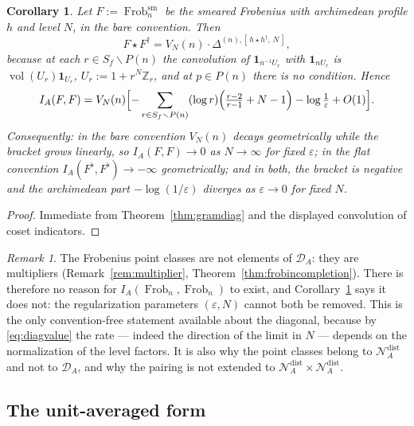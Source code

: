 \documentclass[11pt]{amsart}
\newtheorem{corollary}[theorem]{Corollary}
\theoremstyle{definition}
\theoremstyle{remark}
\newtheorem{remark}[theorem]{Remark}
\newcommand{\Z}{\mathbb Z}
\newcommand{\Frob}{\operatorname{Frob}}
\newcommand{\vol}{\operatorname{vol}}
\newcommand{\DA}{\mathcal D_A}
\begin{document}
\begin{corollary}\label{cor:gramdiagconv}
Let $F:=\Frob_n^{\mathrm{sm}}$ be the smeared Frobenius with archimedean
profile $h$ and level $N$, in the bare convention. Then
\begin{equation}\label{eq:FFdagger}
  F\star F^\dagger=V_N(n)\cdot\Delta^{(n),[\,h\star h^\dagger,\,N\,]},
\end{equation}
because at each $r\in S_f\smallsetminus P(n)$ the convolution of
$\mathbf 1_{n^{-1}U_r}$ with $\mathbf 1_{nU_r}$ is
$\vol(U_r)\mathbf 1_{U_r}$, $U_r:=1+r^N\Z_r$, and at $p\in P(n)$ there is no
condition. Hence
\begin{equation}\label{eq:diagvalue}
  I_A(F,F)=V_N(n)\Bigl[-\sum_{r\in S_f\smallsetminus P(n)}(\log r)
    \Bigl(\tfrac{r-2}{r-1}+N-1\Bigr)-\log\tfrac1\varepsilon+O(1)\Bigr].
\end{equation}
Consequently: in the bare convention $V_N(n)$ decays geometrically while the
bracket grows linearly, so $I_A(F,F)\to0$ as $N\to\infty$ for fixed
$\varepsilon$; in the flat convention $I_A(F^\flat,F^\flat)\to-\infty$
geometrically; and in both, the bracket is negative and the archimedean part
$-\log(1/\varepsilon)$ diverges as $\varepsilon\to0$ for fixed $N$.
\end{corollary}

\begin{proof}
Immediate from Theorem~\ref{thm:gramdiag} and the displayed convolution of
coset indicators.
\end{proof}

\begin{remark}\label{rem:nodiagonal}
The Frobenius point classes are not elements of $\DA$: they are multipliers
(Remark~\ref{rem:multiplier}, Theorem~\ref{thm:frobincompletion}). There is
therefore no reason for $I_A(\Frob_n,\Frob_n)$ to exist, and
Corollary~\ref{cor:gramdiagconv} says it does not: the regularization
parameters $(\varepsilon,N)$ cannot both be removed. This is the only
convention-free statement available about the diagonal, because by
\eqref{eq:diagvalue} the rate --- indeed the direction of the limit in $N$ ---
depends on the normalization of the level factors. It is also why the point
classes belong to $\mathcal N_A^{\mathrm{dist}}$ and not to $\DA$, and why the
pairing is not extended to $\mathcal N_A^{\mathrm{dist}}\times
\mathcal N_A^{\mathrm{dist}}$.
\end{remark}

\subsection{The unit-averaged form}
\end{document}
